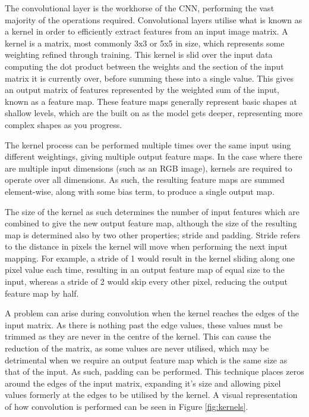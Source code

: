 The convolutional layer is the workhorse of the CNN, performing the vast majority of the operations required. Convolutional layers utilise what is known as a kernel in order to efficiently extract features from an input image matrix. A kernel is a matrix, most commonly 3x3 or 5x5 in size, which represents some weighting refined through training. This kernel is slid over the input data computing the dot product between the weights and the section of the input matrix it is currently over, before summing these into a single value. This gives an output matrix of features represented by the weighted sum of the input, known as a feature map. These feature maps generally represent basic shapes at shallow levels, which are the  built on as the model gets deeper, representing more complex shapes as you progress. 

The kernel process can be performed multiple times over the same input using different weightings, giving multiple output feature maps. In the case where there are multiple input dimensions (such as an RGB image), kernels are required to operate over all dimensions. As such, the resulting feature maps are summed element-wise, along with some bias term, to produce a single output map. 

The size of the kernel as such determines the number of input features which are combined to give the new output feature map, although the size of the resulting map is determined also by two other properties; stride and padding. Stride refers to the distance in pixels the kernel will move when performing the next input mapping. For example, a stride of 1 would result in the kernel sliding along one pixel value each time, resulting in an output feature map of equal size to the input, whereas a stride of 2 would skip every other pixel, reducing the output feature map by half. 

A problem can arise during convolution when the kernel reaches the edges of the input matrix. As there is nothing past the edge values, these values must be trimmed as they are never in the centre of the kernel. This can cause the reduction of the matrix, as some values are never utilised, which may be detrimental when we require an output feature map which is the same size as that of the input. As such, padding can be performed. This technique places zeros around the edges of the input matrix, expanding it's size and allowing pixel values formerly at the edges to be utilised by the kernel. A visual representation of how convolution is performed can be seen in Figure \ref{fig:kernels}.

